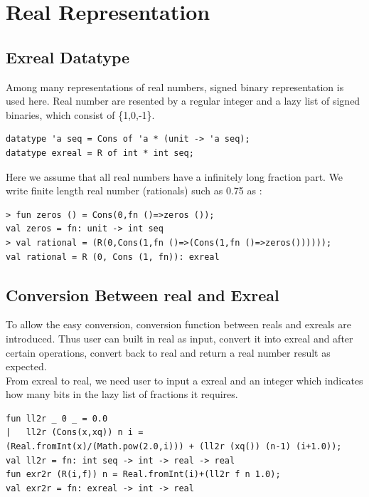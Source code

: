 \documentclass[12pt,twoside,notitlepage]{report}
\begin{document}
\section{Real Representation}


\subsection{Exreal Datatype}

Among many representations of real numbers, signed binary representation is used here.
Real number are resented by a regular integer and a lazy list of signed binaries, which consist of \{1,0,-1\}.

{
\begin{verbatim}
datatype 'a seq = Cons of 'a * (unit -> 'a seq);
datatype exreal = R of int * int seq;
\end{verbatim}
}

Here we assume that all real numbers have a infinitely long fraction part. We write finite length real number (rationals) such as 0.75 as :

{
\begin{verbatim}
> fun zeros () = Cons(0,fn ()=>zeros ());
val zeros = fn: unit -> int seq
> val rational = (R(0,Cons(1,fn ()=>(Cons(1,fn ()=>zeros())))));
val rational = R (0, Cons (1, fn)): exreal
\end{verbatim}
}



\subsection{Conversion Between real and Exreal}

To allow the easy conversion, conversion function between reals and exreals are introduced.
Thus user can built in real as input, convert it into exreal and after certain operations, convert back to real and return a real number result as expected. \\
From exreal to real, we need user to input a exreal and an integer which indicates how many bits in the lazy list of fractions it requires.

{
\begin{verbatim}
fun ll2r _ 0 _ = 0.0
|   ll2r (Cons(x,xq)) n i = 
(Real.fromInt(x)/(Math.pow(2.0,i))) + (ll2r (xq()) (n-1) (i+1.0));
val ll2r = fn: int seq -> int -> real -> real
fun exr2r (R(i,f)) n = Real.fromInt(i)+(ll2r f n 1.0);
val exr2r = fn: exreal -> int -> real
\end{verbatim}
}
    
\end{document}
